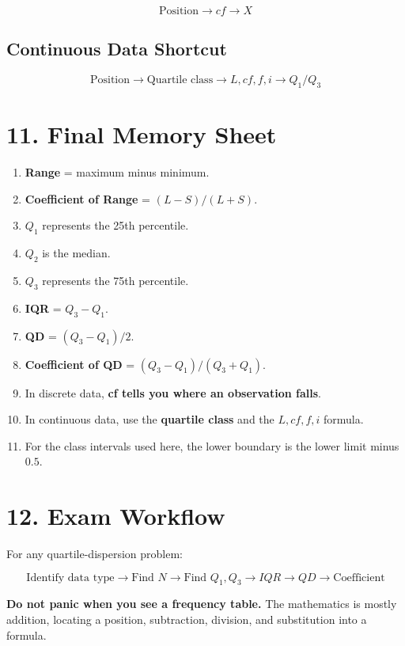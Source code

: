 \documentclass[12pt,a4paper]{article}
\begin{document}
\[
\boxed{\text{Position}\rightarrow cf\rightarrow X}
\]

\subsection*{Continuous Data Shortcut}

\[
\boxed{\text{Position}\rightarrow\text{Quartile class}
\rightarrow L,cf,f,i\rightarrow Q_1/Q_3}
\]

\section{11. Final Memory Sheet}

\begin{enumerate}[label=\textbf{\arabic*.}]
    \item \textbf{Range} = maximum minus minimum.
    \item \textbf{Coefficient of Range} = $(L-S)/(L+S)$.
    \item $Q_1$ represents the 25th percentile.
    \item $Q_2$ is the median.
    \item $Q_3$ represents the 75th percentile.
    \item \textbf{IQR} = $Q_3-Q_1$.
    \item \textbf{QD} = $(Q_3-Q_1)/2$.
    \item \textbf{Coefficient of QD} = $(Q_3-Q_1)/(Q_3+Q_1)$.
    \item In discrete data, \textbf{cf tells you where an observation falls}.
    \item In continuous data, use the \textbf{quartile class} and the $L,cf,f,i$
    formula.
    \item For the class intervals used here, the lower boundary is the lower
    limit minus $0.5$.
\end{enumerate}

\section*{12. Exam Workflow}

For any quartile-dispersion problem:

\[
\boxed{
\text{Identify data type}
\rightarrow
\text{Find }N
\rightarrow
\text{Find }Q_1,Q_3
\rightarrow
IQR
\rightarrow
QD
\rightarrow
\text{Coefficient}
}
\]

\textbf{Do not panic when you see a frequency table.}
The mathematics is mostly addition, locating a position, subtraction,
division, and substitution into a formula.
\end{document}
